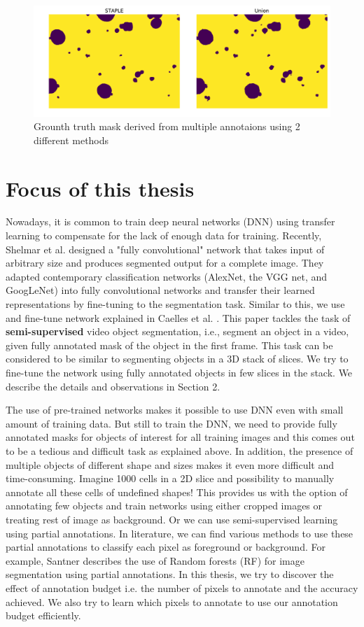 \begin{figure}[] \label{fig:ref}
 \includegraphics[width=0.7\linewidth]{figures/staple.pdf}
\caption{Grounth truth mask derived from multiple annotaions using 2 different methods}
\end{figure}

\section{Focus of this thesis}
Nowadays, it is common to train deep neural networks (DNN) using transfer learning to compensate for the lack of enough data for training. Recently, Shelmar et al. \cite{long:2014} designed a "fully convolutional" network that takes input of arbitrary size and produces segmented output for a complete image. They adapted contemporary classification networks (AlexNet, the VGG net, and GoogLeNet) into fully convolutional networks and transfer their learned representations by fine-tuning to the segmentation task. Similar to this, we use and fine-tune network explained in Caelles et al. \cite{osvos}. This paper tackles the task of \textbf{semi-supervised} video object segmentation, i.e., segment an object in a video, given fully annotated mask of the object in the first frame. This task can be considered to be similar to segmenting objects in a 3D stack of slices. We try to fine-tune the network using fully annotated objects in few slices in the stack. We describe the details and observations in Section 2.

The use of pre-trained networks makes it possible to use DNN even with small amount of training data. But still to train the DNN, we need to provide fully annotated masks for objects of interest for all training images and this comes out to be a tedious and difficult task as explained above. In addition, the presence of multiple objects of different shape and sizes makes it even more difficult and time-consuming. Imagine 1000 cells in a 2D slice and possibility to manually annotate all these cells of undefined shapes! This provides us with the option of annotating few objects and train networks using either cropped images or treating rest of image as background. Or we can use semi-supervised learning using partial annotations. In literature, we can find various methods to use these partial annotations to classify each pixel as foreground or background. For example, Santner \cite{santner:2009} describes the use of Random forests (RF) for image segmentation using partial annotations. In this thesis, we try to discover the effect of annotation budget i.e. the number of pixels to annotate and the accuracy achieved. We also try to learn which pixels to annotate to use our annotation budget efficiently. 

